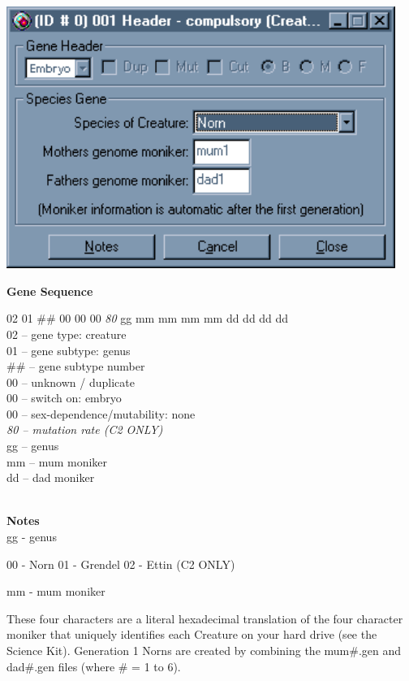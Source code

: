 \documentclass[11pt,twoside,a4paper]{article}
\begin{document}
\begin{minipage}[ht]{0.40\textwidth}
	\includegraphics[width=0.95\textwidth]{img/gen21k.png}
\end{minipage} \hfill \begin{minipage}[ht]{0.575\textwidth}
	\textbf{\large Gene Sequence} %

	02 01 \#\# 00 00 00 \emph{80} gg mm mm mm mm dd dd dd dd ~\\

	02 -- gene type: creature ~\\
	01 -- gene subtype: genus ~\\
	\#\# -- gene subtype number ~\\
	00 -- unknown / duplicate ~\\
	00 -- switch on: embryo ~\\
	00 -- sex-dependence/mutability: none ~\\
	\emph{80 -- mutation rate (C2 ONLY)} ~\\
	gg -- genus ~\\
	mm -- mum moniker ~\\
	dd -- dad moniker ~\\  
\end{minipage} ~\\

\textbf{\large Notes}~\\

gg - genus

    00 - Norn
    01 - Grendel
    02 - Ettin (C2 ONLY) 

mm - mum moniker

These four characters are a literal hexadecimal translation of the four character moniker that uniquely identifies each Creature on your hard drive (see the Science Kit). Generation 1 Norns are created by combining the mum\#.gen and dad\#.gen files (where \# = 1 to 6).
\end{document}
